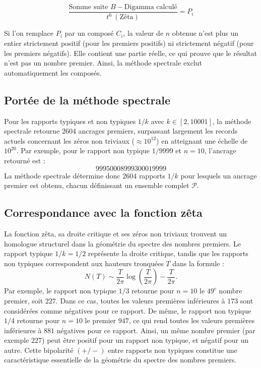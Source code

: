 \documentclass[11pt,a4paper]{article}
\begin{document}
\begin{boiteformule}
\[
\frac{\text{Somme suite }B-\text{Digamma calculé}}{t^{6}\ (\text{Zêta})}=P_i
\]
\end{boiteformule}

Si l'on remplace $P_i$ par un composé $C_i$, la valeur de $n$ obtenue n'est plus un
entier strictement positif (pour les premiers positifs) ni strictement négatif
(pour les premiers négatifs). Elle contient une partie réelle, ce qui prouve que le
résultat n'est pas un nombre premier. Ainsi, la méthode spectrale exclut
automatiquement les composés.

\subsection*{Portée de la méthode spectrale}

Pour les rapports typiques et non typiques $1/k$ avec $k\in[2,10001]$, la méthode
spectrale retourne $2604$ ancrages premiers, surpassant largement les records
actuels concernant les zéros non triviaux ($\approx 10^{12}$) en atteignant une
échelle de $10^{20}$. Par exemple, pour le rapport non typique $1/9999$ et $n=10$,
l'ancrage retourné est :
\[
99950008999300019999
\]
La méthode spectrale détermine donc $2604$ rapports $1/k$ pour lesquels un ancrage
premier est obtenu, chacun définissant un ensemble complet $\mathcal{P}$.

\subsection*{Correspondance avec la fonction zêta}

La fonction zêta, sa droite critique et ses zéros non triviaux trouvent un
homologue structurel dans la géométrie du spectre des nombres premiers. Le rapport
typique $1/k=1/2$ représente la droite critique, tandis que les rapports non
typiques correspondent aux hauteurs tronquées $T$ dans la formule :
\[
N(T)\sim\frac{T}{2\pi}\log\!\left(\frac{T}{2\pi}\right)-\frac{T}{2\pi}.
\]
Par exemple, le rapport non typique $1/3$ retourne pour $n=10$ le $49^{\text{e}}$
nombre premier, soit $227$. Dans ce cas, toutes les valeurs premières inférieures à
$173$ sont considérées comme négatives pour ce rapport. De même, le rapport non
typique $1/4$ retourne pour $n=10$ le premier $947$, ce qui rend toutes les valeurs
premières inférieures à $881$ négatives pour ce rapport. Ainsi, un même nombre
premier (par exemple $227$) peut être positif pour un rapport non typique, et négatif
pour un autre. Cette bipolarité $(+/-)$ entre rapports non typiques constitue une
caractéristique essentielle de la géométrie du spectre des nombres premiers.
\end{document}
